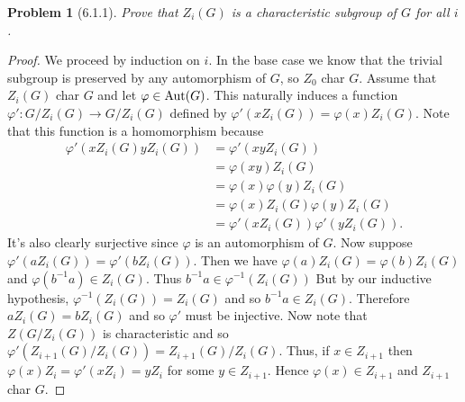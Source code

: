 \documentclass{article}
\newtheorem{problem}{Problem}
\newcommand{\aut}{\textup{Aut}}
\begin{document}

\begin{problem}[6.1.1]
Prove that $Z_i(G)$ is a characteristic subgroup of $G$ for all $i$.
\end{problem}
\begin{proof}
We proceed by induction on $i$. In the base case we know that the trivial subgroup is preserved by any automorphism of $G$, so $Z_0$ char $G$. Assume that $Z_i(G)$ char $G$ and let $\varphi \in \aut(G)$. This naturally induces a function $\varphi' : G/Z_i(G) \to G/Z_i(G)$ defined by $\varphi'(xZ_i(G)) = \varphi(x)Z_i(G)$. Note that this function is a homomorphism because
\begin{align*}
\varphi'(xZ_i(G)yZ_i(G))
&= \varphi'(xyZ_i(G))\\
&= \varphi(xy)Z_i(G)\\
&= \varphi(x)\varphi(y)Z_i(G)\\
&= \varphi(x)Z_i(G) \varphi(y)Z_i(G)\\
&= \varphi'(xZ_i(G))\varphi'(yZ_i(G)).
\end{align*}
It's also clearly surjective since $\varphi$ is an automorphism of $G$. Now suppose $\varphi'(aZ_i(G)) = \varphi'(bZ_i(G))$. Then we have $\varphi(a)Z_i(G) = \varphi(b)Z_i(G)$ and $\varphi(b^{-1}a) \in Z_i(G)$. Thus $b^{-1}a \in \varphi^{-1}(Z_i(G))$ But by our inductive hypothesis, $\varphi^{-1}(Z_i(G)) = Z_i(G)$ and so $b^{-1}a \in Z_i(G)$. Therefore $aZ_i(G) = bZ_i(G)$ and so $\varphi'$ must be injective. Now note that $Z(G/Z_i(G))$ is characteristic and so $\varphi'(Z_{i+1}(G)/Z_i(G)) = Z_{i+1}(G)/Z_i(G)$. Thus, if $x \in Z_{i+1}$ then $\varphi(x)Z_i = \varphi'(xZ_i) = yZ_i$ for some $y \in Z_{i+1}$. Hence $\varphi(x) \in Z_{i+1}$ and $Z_{i+1}$ char $G$.
\end{proof}
\end{document}
